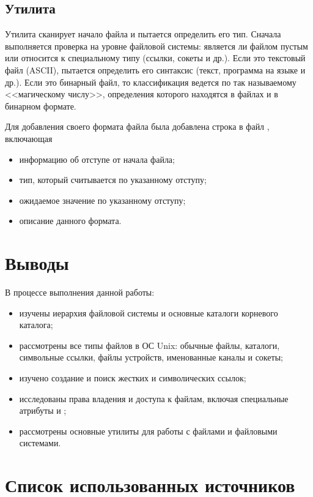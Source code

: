 \subsection{Утилита }

Утилита  сканирует начало файла и пытается определить его тип. Сначала выполняется проверка на уровне файловой системы: является ли файлом пустым или относится к специальному типу (ссылки, сокеты и др.). Если это текстовый файл (ASCII),  пытается определить его синтаксис (текст, программа на языке  и др.). Если это бинарный файл, то классификация ведется по так называемому <<магическому числу>>, определения которого находятся в файлах  и  в бинарном формате.



Для добавления своего формата файла была добавлена строка в файл , включающая 
\begin{itemize}
	\item информацию об отступе от начала файла;
	\item тип, который считывается по указанному отступу;
	\item ожидаемое значение по указанному отступу;
	\item описание данного формата.
\end{itemize}


\section{Выводы}

В процессе выполнения данной работы:
\begin{itemize}
	\item изучены иерархия файловой системы и основные каталоги корневого каталога;
	\item рассмотрены все типы файлов в ОС Unix: обычные файлы, каталоги, символьные ссылки, файлы устройств, именованные каналы и сокеты;
	\item изучено создание и поиск жестких и символических ссылок;
	\item исследованы права владения и доступа к файлам, включая специальные атрибуты  и ;
	\item рассмотрены основные утилиты для работы с файлами и файловыми системами.
\end{itemize}

\section*{Список использованных источников}

